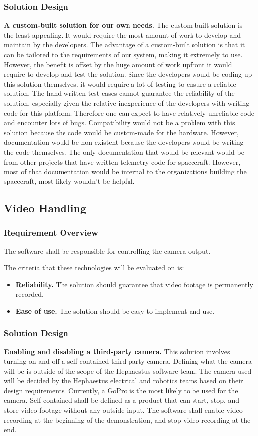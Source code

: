 \documentclass[letterpaper,10pt]{article}
\begin{document}
\subsubsection{Solution Design}
\textbf{A custom-built solution for our own needs}.
The custom-built solution is the least appealing. It would require the most amount of work to develop and maintain by the developers.
The advantage of a custom-built solution is that it can be tailored to the requirements of our system, making it extremely to use.
However, the benefit is offset by the huge amount of work upfront it would require to develop and test the solution.
Since the developers would be coding up this solution themselves, it would require a lot of testing to ensure a reliable solution.
The hand-written test cases cannot guarantee the reliability of the solution, 
especially given the relative inexperience of the developers with writing code for this platform.
Therefore one can expect to have relatively unreliable code and encounter lots of bugs.
Compatibility would not be a problem with this solution because the code would be custom-made for the hardware.
However, documentation would be non-existent because the developers would be writing the code themselves.
The only documentation that would be relevant would be from other projects that have written telemetry code for spacecraft.
However, most of that documentation would be internal to the organizations building the spacecraft,
most likely wouldn't be helpful.

\subsection{Video Handling}
\subsubsection{Requirement Overview}
The software shall be responsible for controlling the camera output.

The criteria that these technologies will be evaluated on is:
\begin{itemize}
\item \textbf{Reliability.}
The solution should guarantee that video footage is permanently recorded.

\item \textbf{Ease of use.}
The solution should be easy to implement and use.
\end{itemize}
\subsubsection{Solution Design}
\textbf{Enabling and disabling a third-party camera.}
This solution involves turning on and off a self-contained third-party camera.
Defining what the camera will be is outside of the scope of the Hephaestus software team.
The camera used will be decided by the Hephaestus electrical and robotics teams
based on their design requirements.
Currently, a GoPro is the most likely to be used for the camera.
Self-contained shall be defined as a product that can start, stop, and store video
footage without any outside input.
The software shall enable video recording at the beginning of the demonstration,
and stop video recording at the end.
\end{document}
